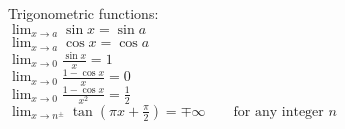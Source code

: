\documentclass{letter}
\begin{document}
Trigonometric functions: \\

$\lim_{x \to a} \sin x = \sin a $ \\
$\lim_{x \to a} \cos x = \cos a $ \\
$\lim_{x \to 0} \frac{\sin x}{x} = 1 $ \\
$\lim_{x \to 0} \frac{1-\cos x}{x} = 0 $ \\
$\lim_{x \to 0} \frac{1-\cos x}{x^2} = \frac{1}{2} $ \\
$\lim_{x \to n^\pm} \tan \left(\pi x + \frac{\pi}{2}\right) = \mp\infty \qquad \text{for any integer } n $ \\
\end{document}
